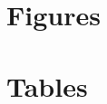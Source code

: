 \documentclass[11pt,twoside]{extarticle}
\begin{document}
\clearpage

\newpage
\singlespacing
\footnotesize


\begingroup

\endgroup

\normalsize
\clearpage
\section{Figures}


\clearpage
\section{Tables}





\end{document}
